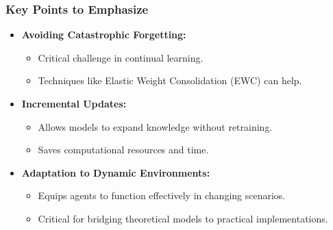 \documentclass[aspectratio=169]{beamer}
\begin{document}
\begin{frame}[fragile]
    \frametitle{Key Points to Emphasize}
    \begin{itemize}
        \item \textbf{Avoiding Catastrophic Forgetting:} 
            \begin{itemize}
                \item Critical challenge in continual learning.
                \item Techniques like Elastic Weight Consolidation (EWC) can help.
            \end{itemize}

        \item \textbf{Incremental Updates:}
            \begin{itemize}
                \item Allows models to expand knowledge without retraining.
                \item Saves computational resources and time.
            \end{itemize}

        \item \textbf{Adaptation to Dynamic Environments:}
            \begin{itemize}
                \item Equips agents to function effectively in changing scenarios.
                \item Critical for bridging theoretical models to practical implementations.
            \end{itemize}
    \end{itemize}
\end{frame}
\end{document}
